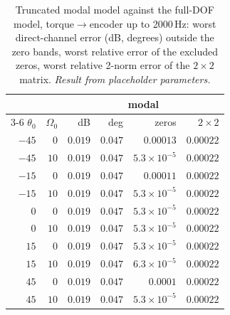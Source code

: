 \documentclass[10pt,a4paper]{article}
\numberwithin{equation}{section}
\begin{document}
\begin{table}[H]\centering\small\setlength{\tabcolsep}{4pt}
\caption{Truncated modal model against the full-DOF model, torque$\to$encoder up to 2000\,Hz: worst direct-channel error (dB, degrees) outside the zero bands, worst relative error of the excluded zeros, worst relative 2-norm error of the $2\times2$ matrix. \emph{Result from placeholder parameters.}}\label{tab:modal_vs_full}
\begin{tabular}{rrrrrr}\toprule
& & \multicolumn{4}{c}{modal} \\ \cmidrule(lr){3-6}
$\theta_0$ & $\Omega_0$ & dB & deg & zeros & $2\times2$ \\ \midrule
$-45$ & $0$ & $0.019$ & $0.047$ & $0.00013$ & $0.00022$ \\
$-45$ & $10$ & $0.019$ & $0.047$ & $5.3\times10^{-5}$ & $0.00022$ \\
$-15$ & $0$ & $0.019$ & $0.047$ & $0.00011$ & $0.00022$ \\
$-15$ & $10$ & $0.019$ & $0.047$ & $5.3\times10^{-5}$ & $0.00022$ \\
$0$ & $0$ & $0.019$ & $0.047$ & $5.3\times10^{-5}$ & $0.00022$ \\
$0$ & $10$ & $0.019$ & $0.047$ & $5.3\times10^{-5}$ & $0.00022$ \\
$15$ & $0$ & $0.019$ & $0.047$ & $5.3\times10^{-5}$ & $0.00022$ \\
$15$ & $10$ & $0.019$ & $0.047$ & $6.3\times10^{-5}$ & $0.00022$ \\
$45$ & $0$ & $0.019$ & $0.047$ & $0.0001$ & $0.00022$ \\
$45$ & $10$ & $0.019$ & $0.047$ & $5.3\times10^{-5}$ & $0.00022$ \\
\bottomrule\end{tabular}\end{table}
\end{document}
